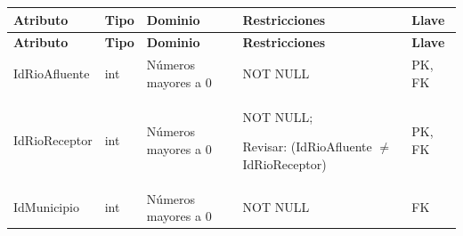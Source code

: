 \begin{longtable}{p{2.5cm} p{2.2cm} p{4.5cm} p{5.7cm} p{1.5cm}}
\toprule
\textbf{Atributo} & \textbf{Tipo} & \textbf{Dominio} & \textbf{Restricciones} & \textbf{Llave} \\
\midrule
\endfirsthead

\toprule
\textbf{Atributo} & \textbf{Tipo} & \textbf{Dominio} & \textbf{Restricciones} & \textbf{Llave} \\
\midrule
\endhead

\bottomrule
\endfoot


IdRioAfluente
& int
& Números mayores a 0
& NOT NULL
& PK, FK \\

IdRioReceptor
& int
& Números mayores a 0
& NOT NULL;

Revisar: (IdRioAfluente $\neq$ IdRioReceptor)
& PK, FK \\

IdMunicipio
& int
& Números mayores a 0
& NOT NULL
& FK \\

\end{longtable}